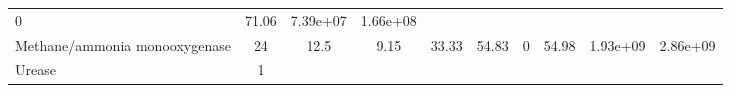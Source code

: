 \documentclass[]{article}
\begin{document}
\begin{longtable}[]{@{}lccccccccc@{}}
\begin{minipage}[t]{0.08\columnwidth}
0\strut
\end{minipage} & \begin{minipage}[t]{0.08\columnwidth}\centering\strut
71.06\strut
\end{minipage} & \begin{minipage}[t]{0.08\columnwidth}\centering\strut
7.39e+07\strut
\end{minipage} & \begin{minipage}[t]{0.08\columnwidth}\centering\strut
1.66e+08\strut
\end{minipage}\tabularnewline
\begin{minipage}[t]{0.07\columnwidth}\raggedright\strut
Methane/ammonia monooxygenase\strut
\end{minipage} & \begin{minipage}[t]{0.06\columnwidth}\centering\strut
24\strut
\end{minipage} & \begin{minipage}[t]{0.08\columnwidth}\centering\strut
12.5\strut
\end{minipage} & \begin{minipage}[t]{0.08\columnwidth}\centering\strut
9.15\strut
\end{minipage} & \begin{minipage}[t]{0.08\columnwidth}\centering\strut
33.33\strut
\end{minipage} & \begin{minipage}[t]{0.08\columnwidth}\centering\strut
54.83\strut
\end{minipage} & \begin{minipage}[t]{0.08\columnwidth}\centering\strut
0\strut
\end{minipage} & \begin{minipage}[t]{0.08\columnwidth}\centering\strut
54.98\strut
\end{minipage} & \begin{minipage}[t]{0.08\columnwidth}\centering\strut
1.93e+09\strut
\end{minipage} & \begin{minipage}[t]{0.08\columnwidth}\centering\strut
2.86e+09\strut
\end{minipage}\tabularnewline
\begin{minipage}[t]{0.07\columnwidth}\raggedright\strut
Urease\strut
\end{minipage} & \begin{minipage}[t]{0.06\columnwidth}\centering\strut
1\strut
\end{minipage} & \begin{minipage}[t]{0.08\columnwidth}\centering\strut

\end{minipage}
\end{longtable}
\end{document}
